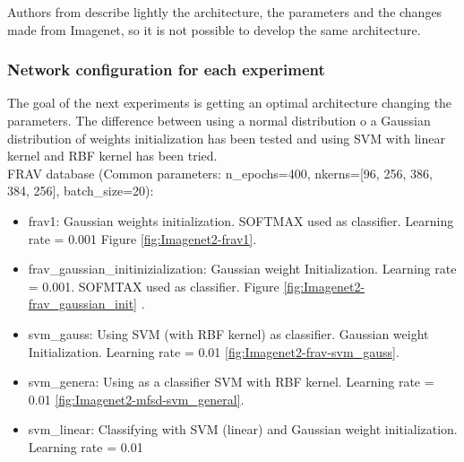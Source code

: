 Authors from \cite{yangLL14} describe lightly the architecture, the parameters and the changes made from Imagenet, so it is not possible to develop the same architecture.\\


\subsubsection{Network configuration for each experiment}
The goal of the next experiments is getting an optimal architecture changing the parameters. The difference between using a normal distribution o a Gaussian distribution of weights initialization has been tested and using SVM with linear kernel and RBF kernel has been tried.\\

FRAV database (Common parameters:  n\_epochs=400, nkerns=[96, 256, 386, 384, 256], batch\_size=20):\\
\begin{itemize}
\item frav1: Gaussian weights initialization. SOFTMAX used as classifier. Learning rate = 0.001 Figure \ref{fig:Imagenet2-frav1}.
\item  frav\_gaussian\_initinizialization: Gaussian weight Initialization. Learning rate = 0.001. SOFMTAX used as classifier. Figure \ref{fig:Imagenet2-frav_gaussian_init} .
\item svm\_gauss: Using SVM (with RBF kernel) as classifier. Gaussian weight Initialization. Learning rate = 0.01 \ref{fig:Imagenet2-frav-svm_gauss}.
\item svm\_genera: Using as a classifier SVM with RBF kernel. Learning rate = 0.01 \ref{fig:Imagenet2-mfsd-svm_general}.
\item svm\_linear: Classifying with SVM (linear) and Gaussian weight initialization. Learning rate = 0.01\\
\end{itemize}

